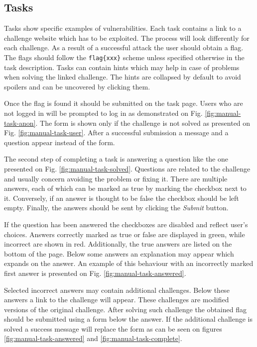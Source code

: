\subsection{Tasks}

Tasks show specific examples of vulnerabilities. Each task contains a link to a challenge website which has to be exploited. The process will look differently for each challenge. As a result of a successful attack the user should obtain a flag. The flags should follow the \texttt{flag\{xxx\}} scheme unless specified otherwise in the task description. Tasks can contain hints which may help in case of problems when solving the linked challenge. The hints are collapsed by default to avoid spoilers and can be uncovered by clicking them.

Once the flag is found it should be submitted on the task page. Users who are not logged in will be prompted to log in as demonstrated on Fig. \ref{fig:manual-task-anon}. The form is shown only if the challenge is not solved as presented on Fig. \ref{fig:manual-task-user}. After a successful submission a message and a question appear instead of the form.

The second step of completing a task is answering a question like the one presented on Fig. \ref{fig:manual-task-solved}. Questions are related to the challenge and usually concern avoiding the problem or fixing it. There are multiple answers, each of which can be marked as true by marking the checkbox next to it. Conversely, if an answer is thought to be false the checkbox should be left empty. Finally, the answers should be sent by clicking the \textit{Submit} button.

If the question has been answered the checkboxes are disabled and reflect user's choices. Answers correctly marked as true or false are displayed in green, while incorrect are shown in red. Additionally, the true answers are listed on the bottom of the page. Below some answers an explanation may appear which expands on the answer. An example of this behaviour with an incorrectly marked first answer is presented on Fig. \ref{fig:manual-task-answered}.

Selected incorrect answers may contain additional challenges. Below these answers a link to the challenge will appear. These challenges are modified versions of the original challenge. After solving such challenge the obtained flag should be submitted using a form below the answer. If the additional challenge is solved a success message will replace the form as can be seen on figures \ref{fig:manual-task-answered} and \ref{fig:manual-task-complete}.

